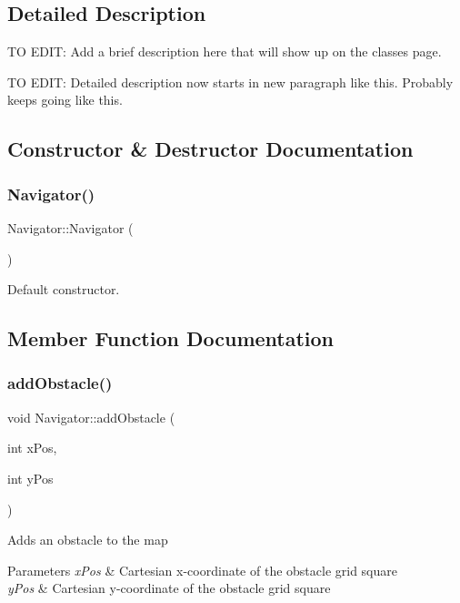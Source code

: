 \subsection{Detailed Description}
TO E\+D\+IT\+: Add a brief description here that will show up on the classes page. 

TO E\+D\+IT\+: Detailed description now starts in new paragraph like this. Probably keeps going like this. 

\subsection{Constructor \& Destructor Documentation}
\mbox{\label{class_navigator_a59230ab4698882f754d5ce275a1a4030}} 
\subsubsection{\texorpdfstring{Navigator()}{Navigator()}}
{\footnotesize\ttfamily Navigator\+::\+Navigator (\begin{DoxyParamCaption}{ }\end{DoxyParamCaption})}



Default constructor. 



\subsection{Member Function Documentation}
\mbox{\label{class_navigator_af5a35f0ae71309c1b276257709b24390}} 
\subsubsection{\texorpdfstring{add\+Obstacle()}{addObstacle()}}
{\footnotesize\ttfamily void Navigator\+::add\+Obstacle (\begin{DoxyParamCaption}\item[{int}]{x\+Pos,  }\item[{int}]{y\+Pos }\end{DoxyParamCaption})}

Adds an obstacle to the map


\begin{DoxyParams}{Parameters}
{\em x\+Pos} & Cartesian x-\/coordinate of the obstacle grid square \\
\hline
{\em y\+Pos} & Cartesian y-\/coordinate of the obstacle grid square \\
\hline
\end{DoxyParams}
\mbox{\label{class_navigator_a7a745d33cfa5cdfc551c87f3f23dc28e}} 
